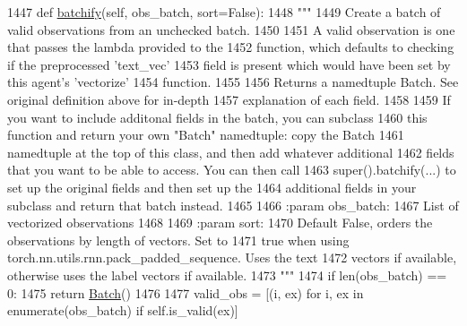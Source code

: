 \begin{DoxyCode}
1447     \textcolor{keyword}{def }\hyperlink{namespaceparlai_1_1agents_1_1drqa_1_1utils_aca22dd97c5b6dcda2a7479c1cb22ef1e}{batchify}(self, obs\_batch, sort=False):
1448         \textcolor{stringliteral}{"""}
1449 \textcolor{stringliteral}{        Create a batch of valid observations from an unchecked batch.}
1450 \textcolor{stringliteral}{}
1451 \textcolor{stringliteral}{        A valid observation is one that passes the lambda provided to the}
1452 \textcolor{stringliteral}{        function, which defaults to checking if the preprocessed 'text\_vec'}
1453 \textcolor{stringliteral}{        field is present which would have been set by this agent's 'vectorize'}
1454 \textcolor{stringliteral}{        function.}
1455 \textcolor{stringliteral}{}
1456 \textcolor{stringliteral}{        Returns a namedtuple Batch. See original definition above for in-depth}
1457 \textcolor{stringliteral}{        explanation of each field.}
1458 \textcolor{stringliteral}{}
1459 \textcolor{stringliteral}{        If you want to include additonal fields in the batch, you can subclass}
1460 \textcolor{stringliteral}{        this function and return your own "Batch" namedtuple: copy the Batch}
1461 \textcolor{stringliteral}{        namedtuple at the top of this class, and then add whatever additional}
1462 \textcolor{stringliteral}{        fields that you want to be able to access. You can then call}
1463 \textcolor{stringliteral}{        super().batchify(...) to set up the original fields and then set up the}
1464 \textcolor{stringliteral}{        additional fields in your subclass and return that batch instead.}
1465 \textcolor{stringliteral}{}
1466 \textcolor{stringliteral}{        :param obs\_batch:}
1467 \textcolor{stringliteral}{            List of vectorized observations}
1468 \textcolor{stringliteral}{}
1469 \textcolor{stringliteral}{        :param sort:}
1470 \textcolor{stringliteral}{            Default False, orders the observations by length of vectors. Set to}
1471 \textcolor{stringliteral}{            true when using torch.nn.utils.rnn.pack\_padded\_sequence.  Uses the text}
1472 \textcolor{stringliteral}{            vectors if available, otherwise uses the label vectors if available.}
1473 \textcolor{stringliteral}{        """}
1474         \textcolor{keywordflow}{if} len(obs\_batch) == 0:
1475             \textcolor{keywordflow}{return} \hyperlink{namespaceparlai_1_1agents_1_1legacy__agents_1_1seq2seq_1_1torch__agent__v1_a74cfde390a2b9861179ac0fcd59da28c}{Batch}()
1476 
1477         valid\_obs = [(i, ex) \textcolor{keywordflow}{for} i, ex \textcolor{keywordflow}{in} enumerate(obs\_batch) \textcolor{keywordflow}{if} self.is\_valid(ex)]

\end{DoxyCode}
